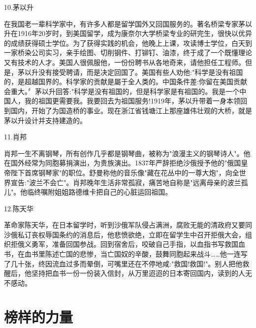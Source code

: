 \documentclass[UTF8]{ctexart}
\begin{document}
10.茅以升\par
在我国老一辈科学家中，有许多人都是留学国外又回国服务的。著名桥梁专家茅以升在1916年20岁时，到美国留学，成为康奈尔大学桥梁专业的研完生，很快以优异的成绩获得硕士学位。为了获得实践的机会，他晚上上课，攻读博士学位，白天到一家桥染公司实习，亲手绘图、切削钢件、打铆钉、油漆，终于成了一个既懂理论又有技术的人才。美国人很佩服他，一份份聘书从各地奇来，请他担任工程师。但是，茅以升没有接受聘请，而是决定回国了。美国有些人劝他:"科学是没有祖国的，是超越国界的。科学家的贡献是屬于全人类的。中国条件差:你留在美国贡献会重大。〞茅以升回答:"科学是没有祖国的，但是科学家是有祖国的。我是一个中国人，我的祖国更需要我。我要回去为祖国服务!1919年，茅以升带着一身本领回到国内，开始了为国造桥的事业。现在浙江省钱塘江上那座雄伟壮观的大桥，就是茅以升设计并支持建造的。\par
11.肖邦\par
肖邦⼀⽣不离钢琴，所有创作⼏乎都是钢琴曲，被称为"浪漫主义的钢琴诗⼈"。他在国外经常为同胞募捐演出，为贵族演出。1837年严辞拒绝沙俄授予他的"俄国皇帝陛下⾸席钢琴家"的职位。舒曼称他的⾳乐像"藏在花丛中的⼀尊⼤炮"，向全世界宣告:"波兰不会亡"。肖邦晚年⽣活⾮常孤寂，痛苦地⾃称是"远离母亲的波兰孤⼉"。他临终嘱附姐姐路德维卡把⾃⼰的⼼脏运回祖国。\par
12.陈天华\par
⾰命家陈天华，在⽇本留学时，听到沙俄军队侵占满洲，腐败⽆能的清政府⼜要同沙俄私订丧权辱国条约的消息后，他悲愤欲绝，⽴即在留学⽣中召开拒俄⼤会，组织拒俄义勇军，准备回国参战。回到宿舍后，咬破⾃⼰⼿指，以⾎指书写救国⾎书，在⾎书⾥陈述亡国的悲惨，当亡国奴的⾟酸，⿎舞同胞起来战⽃……他⼀连写了⼏⼗张，终因流⾎过多⽽晕倒，可嘴⾥还在不停地咸:"救国!救国!"。别⼈把他救醒后，他坚持把⾎书⼀份⼀份装⼊信封，从万⾥迢迢的⽇本寄回国内，读到的⼈⽆不感动。\par
\newpage
\section{榜样的力量}
\end{document}

